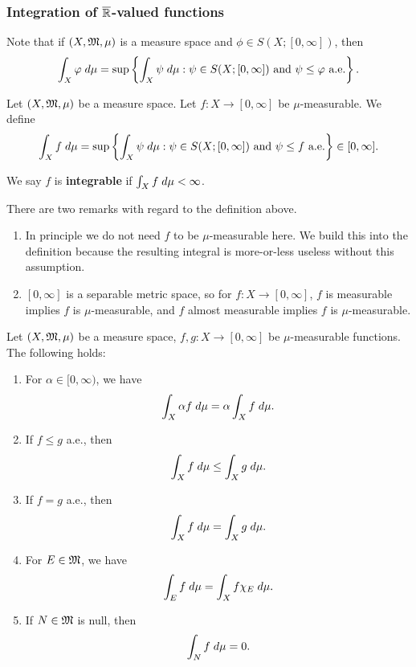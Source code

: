 \documentclass[a4paper]{article}
\begin{document}
\subsubsection{Integration of $\overline{\mathbb{R}}$-valued functions}

Note that if $(X, \mathfrak{M}, \mu)$ is a measure space and 
$\phi \in S(X; [0, \infty])$, then 
\[
\int_X \varphi \; d\mu = 
\sup \left\{ \int_X \psi \; d\mu : 
\psi \in S(X; [0, \infty]) \text{ and $\psi \leq \varphi$
a.e.} \right\}.
\]

\begin{defi}
  Let $(X, \mathfrak{M}, \mu)$ be a measure space. Let 
  $f : X \to [0, \infty]$ be $\mu$-measurable. We 
  define 
  \[
  \int_X f \; d\mu = 
  \sup \left\{ \int_X \psi \; d\mu: 
  \text{$\psi \in S(X; [0, \infty])$ and 
  $\psi \leq f$ a.e.} \right\} 
  \in [0, \infty].
  \]

  We say $f$ is \textbf{integrable} if $\int_X f \; d \mu < 
  \infty$.
\end{defi}

\begin{remark}
There are two remarks with regard to the definition 
above.
\begin{enumerate}
  \item In principle we do not need $f$ to be $\mu$-measurable
  here. We build this into the definition because the 
  resulting integral is more-or-less useless without this 
  assumption. 
  \item $[0, \infty]$ is a separable metric space,
  so for $f : X \to [0, \infty]$, 
  $f$ is measurable implies $f$ is $\mu$-measurable,
  and $f$ almost measurable implies $f$ is $\mu$-measurable.
\end{enumerate}
\end{remark}

\begin{thm}
Let $(X, \mathfrak{M}, \mu)$ be a measure space, $f, g : X \to [0, \infty]$
be $\mu$-measurable functions. The following holds: 
\begin{enumerate}
  \item For $\alpha \in [0, \infty)$, we have 
  \[
  \int_X \alpha f \; d \mu = \alpha \int_X f \; d \mu.
  \]
  \item If $f \leq g$ a.e., then 
  \[
  \int_X f \; d \mu \leq \int_X g \; d \mu.
  \]
  \item If $f = g$ a.e., then 
  \[
  \int_X f \; d \mu = \int_X g \; d \mu.
  \]
  \item For $E \in \mathfrak{M}$, we have 
  \[
  \int_E f \; d \mu = \int_X f \chi_E \; d \mu.
  \]
  \item If $N \in \mathfrak{M}$ is null, then 
  \[
  \int_N f \; d \mu = 0.
  \]
\end{enumerate}
\end{thm}
\end{document}
